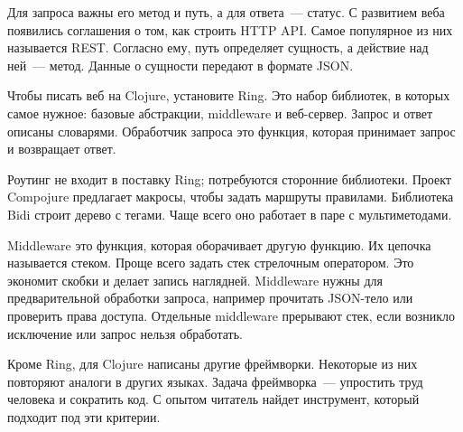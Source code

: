 Для запроса важны его метод и путь, а для ответа~--- статус. С развитием веба
появились соглашения о том, как строить HTTP API. Самое популярное из них
называется REST. Согласно ему, путь определяет сущность, а действие над ней~---
метод. Данные о сущности передают в формате JSON.

Чтобы писать веб на Clojure, установите Ring. Это набор библиотек, в которых
самое нужное: базовые абстракции, middleware и веб-сервер. Запрос и ответ
описаны словарями. Обработчик запроса это функция, которая принимает запрос и
возвращает ответ.

Роутинг не входит в поставку Ring; потребуются сторонние библиотеки. Проект
Compojure предлагает макросы, чтобы задать маршруты правилами. Библиотека Bidi
строит дерево с тегами. Чаще всего оно работает в паре с мультиметодами.

Middleware это функция, которая оборачивает другую функцию. Их цепочка
называется стеком. Проще всего задать стек стрелочным оператором. Это экономит
скобки и делает запись наглядней. Middleware нужны для предварительной обработки
запроса, например прочитать JSON-тело или проверить права доступа. Отдельные
middleware прерывают стек, если возникло исключение или запрос нельзя
обработать.

Кроме Ring, для Clojure написаны другие фреймворки. Некоторые из них повторяют
аналоги в других языках. Задача фреймворка~--- упростить труд человека и
сократить код. С опытом читатель найдет инструмент, который подходит под эти
критерии.

